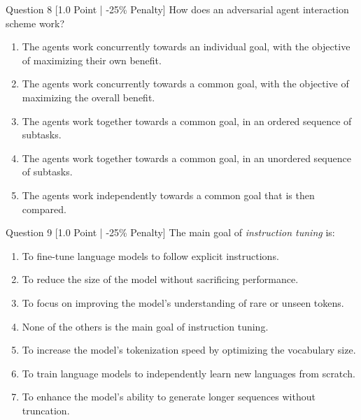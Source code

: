 \documentclass[11pt,a4paper]{article}
\begin{document}
\begin{questionbox}{Question 8 \hfill [1.0 Point | -25\% Penalty]}
How does an adversarial agent interaction scheme work?
\begin{enumerate}[label=(\alph*)]
    \item The agents work concurrently towards an individual goal, with the objective of maximizing their own benefit.
    \item The agents work concurrently towards a common goal, with the objective of maximizing the overall benefit.
    \item The agents work together towards a common goal, in an ordered sequence of subtasks.
    \item The agents work together towards a common goal, in an unordered sequence of subtasks.
    \item The agents work independently towards a common goal that is then compared.
\end{enumerate}
\end{questionbox}

\begin{questionbox}{Question 9 \hfill [1.0 Point | -25\% Penalty]}
The main goal of \textit{instruction tuning} is:
\begin{enumerate}[label=(\alph*)]
    \item To fine-tune language models to follow explicit instructions.
    \item To reduce the size of the model without sacrificing performance.
    \item To focus on improving the model's understanding of rare or unseen tokens.
    \item None of the others is the main goal of instruction tuning.
    \item To increase the model's tokenization speed by optimizing the vocabulary size.
    \item To train language models to independently learn new languages from scratch.
    \item To enhance the model's ability to generate longer sequences without truncation.
\end{enumerate}
\end{questionbox}
\end{document}
